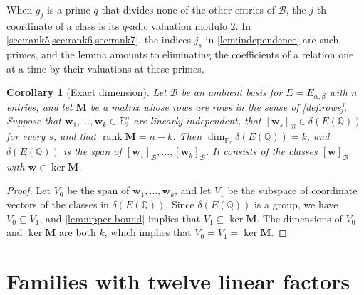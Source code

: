 \documentclass[12pt,oneside,openany]{book}
\theoremstyle{definition}
\theoremstyle{plain}
\numberwithin{equation}{chapter}
\theoremstyle{plain}
\newtheorem{corollary}[corollary]{Corollary}
\theoremstyle{definition}
\theoremstyle{remark}
\newcommand{\Q}{\mathbb Q}
\newcommand{\F}{\mathbb F}
\DeclareMathOperator{\rk}{rank}
\newcommand{\sq}[1]{[#1]}
\newcommand{\cB}{\mathcal B}
\begin{document}
When $g_j$ is a prime $q$ that divides none of the other entries of $\cB$, the $j$-th coordinate of a class is its $q$-adic valuation modulo $2$. In \cref{sec:rank5,sec:rank6,sec:rank7}, the indices $j_s$ in \cref{lem:independence} are such primes, and the lemma amounts to eliminating the coefficients of a relation one at a time by their valuations at these primes.

\begin{corollary}[Exact dimension]\label{cor:exact-dimension}
Let $\cB$ be an ambient basis for $E=E_{\alpha,\beta}$ with $n$ entries, and let $\mathbf M$ be a matrix whose rows are rows in the sense of \cref{def:rows}. Suppose that $\mathbf w_1,\dots,\mathbf w_k\in\F_2^n$ are linearly independent, that $\sq{\mathbf w_s}_{\cB}\in\delta(E(\Q))$ for every $s$, and that $\rk\mathbf M=n-k$. Then $\dim_{\F_2}\delta(E(\Q))=k$, and $\delta(E(\Q))$ is the span of $\sq{\mathbf w_1}_{\cB},\dots,\sq{\mathbf w_k}_{\cB}$. It consists of the classes $\sq{\mathbf w}_{\cB}$ with $\mathbf w\in\ker\mathbf M$.
\end{corollary}

\begin{proof}
Let $V_0$ be the span of $\mathbf w_1,\dots,\mathbf w_k$, and let $V_1$ be the subspace of coordinate vectors of the classes in $\delta(E(\Q))$. Since $\delta(E(\Q))$ is a group, we have $V_0\subseteq V_1$, and \cref{lem:upper-bound} implies that $V_1\subseteq\ker\mathbf M$. The dimensions of $V_0$ and $\ker\mathbf M$ are both $k$, which implies that $V_0=V_1=\ker\mathbf M$.
\end{proof}
\chapter{Families with twelve linear factors}\label{sec:families}
\end{document}
